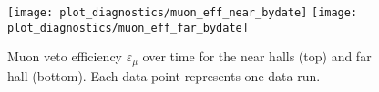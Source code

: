 \begin{figure}
    \texttt{[image: plot\_diagnostics/muon\_eff\_near\_bydate]}
    \texttt{[image: plot\_diagnostics/muon\_eff\_far\_bydate]}
    \caption{
        Muon veto efficiency $\varepsilon_\mu$ over time for
        the near halls (top) and far hall (bottom).
        Each data point represents one data run.
    }
    \label{fig:veto_eff}
\end{figure}





